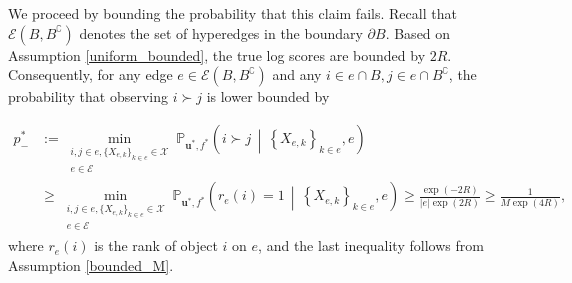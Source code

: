 \documentclass[
  12pt]{article}
\begin{document}
We proceed by bounding the probability that this claim fails. Recall that $\mathcal{E}(B, B^\complement)$ denotes the set of hyperedges in the boundary $\partial B$. Based on Assumption \ref{uniform_bounded}, the true log scores are bounded by $2R$. Consequently, for any edge $e \in \mathcal{E}(B, B^\complement)$ and any $i \in e \cap B, j \in e \cap B^\complement$, the probability that observing $i \succ j$ is lower bounded by 

$$\begin{aligned}
p^*_{-} &:= \min_{\substack{i, j \in e,  \{X_{e,k}\}_{k\in e} \in \mathcal{X} \\ e \in \mathcal{E}}}\mathbb{P}_{\boldsymbol{u}^*, f^*}\left(i \succ j \,\middle|\, \left\{X_{e,k}\right\}_{k\in e}, e\right) \\
&\geq \min_{\substack{i, j \in e,  \{X_{e,k}\}_{k\in e} \in \mathcal{X} \\ e \in \mathcal{E}}}\mathbb{P}_{\boldsymbol{u}^*, f^*}\left(r_e(i)=1 \,\middle|\, \left\{X_{e,k}\right\}_{k\in e}, e\right) \geq \frac{\exp(-2R)}{|e| \exp(2R)} \geq \frac{1}{M \exp(4R)},
\end{aligned}$$
where $r_e(i)$ is the rank of object $i$ on $e$, and the last inequality follows from Assumption \ref{bounded_M}.
\end{document}
